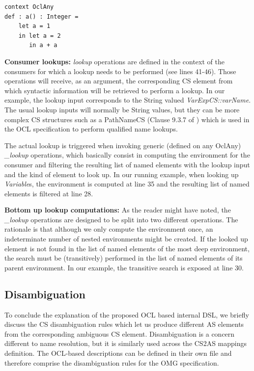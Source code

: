 \documentclass{llncs}
\begin{document}
\begin{lstlisting}[caption=LetExp variables occlude outer variables, label=lst:nestedEnvExample, language=OCL]
context OclAny
def : a() : Integer =
	let a = 1
	in let a = 2
	   in a + a
\end{lstlisting}
	   
\textbf{Consumer lookups:} \emph{lookup} operations are defined in the context of the consumers for which a lookup needs to be performed (see lines 41-46). Those operations will receive, as an argument, the corresponding CS element from which syntactic information will be retrieved to perform a lookup. In our example, the lookup input corresponds to the String valued \emph{VarExpCS::varName}. The usual lookup inputs will normally be String values, but they can be more complex CS structures such as a PathNameCS (Clause 9.3.7 of \cite{omg2013ocl}) which is used in the OCL specification to perform qualified name lookups. 

The actual lookup is triggered when invoking generic (defined on any OclAny) \emph{\_lookup} operations, which basically consist in computing the environment for the consumer and filtering the resulting list of named elements with the lookup input and the kind of element to look up. In our running example, when looking up \emph{Variable}s, the environment is computed at line 35 and the resulting list of named elements is filtered at line 28.

\textbf{Bottom up lookup computations:} As the reader might have noted, the \emph{\_lookup} operations are designed to be split into two different operations. The rationale is that although we only compute the environment once, an indeterminate number of nested environments might be created. If the looked up element is not found in the list of named elements of the most deep environment, the search must be (transitively) performed in the list of named elements of its parent environment. In our example, the transitive search is exposed at line 30.
\textbf{}

\subsection{Disambiguation}
\label{subsec:disamb}

To conclude the explanation of the proposed OCL based internal DSL, we briefly discuss the CS disambiguation rules which let us produce different AS elements from the corresponding ambiguous CS element. Disambiguation is a concern different to name resolution, but it is similarly used across the CS2AS mappings definition. The OCL-based descriptions can be defined in their own file and therefore comprise the disambiguation rules for the OMG specification. 
\end{document}

